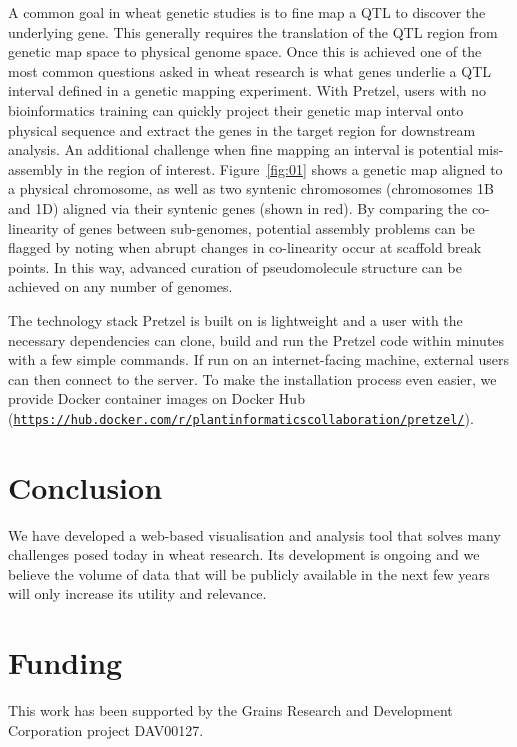A common goal in wheat genetic studies is to fine map a QTL to discover the underlying gene. This generally requires the translation of the
  QTL region from genetic map space to physical genome space. Once this is achieved one of the most common questions asked in wheat research 
  is what genes underlie a QTL interval defined in a genetic mapping experiment. 
%
With Pretzel, users with no bioinformatics training can quickly project their genetic map interval
  onto physical sequence and extract the genes in the target region for downstream analysis. 
%
An additional challenge when fine mapping an interval is potential mis-assembly in the region
  of interest. Figure~\ref{fig:01} shows a genetic map aligned to a physical chromosome, as well as
  two syntenic chromosomes (chromosomes 1B and 1D) aligned via their syntenic genes (shown in red). 
%
By comparing the co-linearity of genes between sub-genomes, potential assembly problems can be
  flagged by noting when abrupt changes in co-linearity occur at scaffold break points. 
%
In this way, advanced curation of pseudomolecule structure can be achieved on any number of genomes.

The technology stack Pretzel is built on is lightweight and a user with the necessary dependencies
can clone, build and run the Pretzel code within minutes with a few simple commands. 
%
If run on an internet-facing machine, external users can then connect to the server.
%
To make the installation process even easier, we provide Docker container images on Docker Hub
(\href{https://hub.docker.com/r/plantinformaticscollaboration/pretzel/}{\nolinkurl{https://hub.docker.com/r/plantinformaticscollaboration/pretzel/}}).

\section{Conclusion}

We have developed a web-based visualisation and analysis tool that solves many challenges posed today in wheat research. 
%
Its development is ongoing and we believe the volume of data that will be publicly available in the next few years will only increase its utility and relevance.

\section*{Funding}

This work has been supported by the Grains Research and Development Corporation project DAV00127.\vspace*{-12pt}




